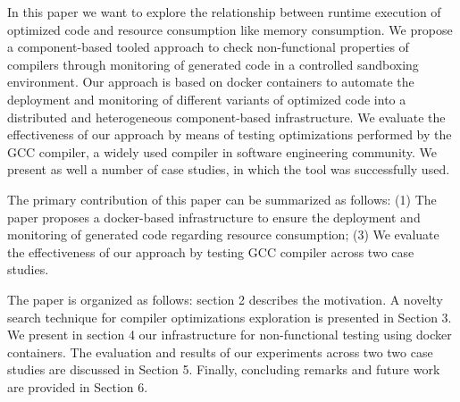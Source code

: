 In this paper we want to explore the relationship between runtime execution of optimized code and resource consumption like memory consumption.
We propose a component-based tooled approach to check non-functional properties of compilers through monitoring of generated code in a controlled sandboxing environment. Our approach is based on docker containers to automate the deployment and monitoring of different variants of optimized code into a distributed and heterogeneous component-based infrastructure. 
We evaluate the effectiveness of our approach by means of testing optimizations performed by the GCC compiler, a widely used compiler in software engineering community. We present as well a number of case studies, in which the tool was successfully used.


The primary contribution of this paper can be summarized as follows: (1) The paper proposes a docker-based infrastructure to ensure the deployment and monitoring of generated code regarding resource consumption; (3) We evaluate the effectiveness of our approach by testing GCC compiler across two case studies.
 

The paper is organized as follows: section 2 describes the motivation. A novelty search technique for compiler optimizations exploration is presented in Section 3. We present in section 4 our infrastructure for non-functional testing using docker containers. The evaluation and results of our experiments across two two case studies are discussed in Section 5. Finally, concluding remarks and future work are provided in Section 6.




 
 

